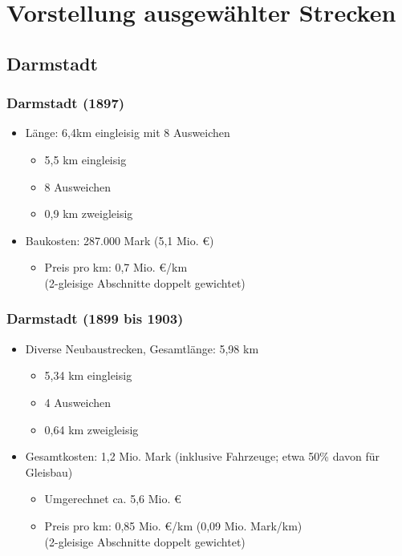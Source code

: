 \documentclass[xcolor=dvipsnames]{beamer}
\begin{document}
\section{Vorstellung ausgewählter Strecken}

\subsection{Darmstadt}
\begin{frame}
  \frametitle{Darmstadt (1897)}

  \begin{itemize}
    \item Länge: 6,4km eingleisig mit 8 Ausweichen
      \begin{itemize}
        \item 5,5 km eingleisig
        \item 8 Ausweichen
        \item 0,9 km zweigleisig
      \end{itemize}
    \item Baukosten: 287.000 Mark (5,1 Mio. €)
      \begin{itemize}
        \item Preis pro km: 0,7 Mio. €/km\\
          (2-gleisige Abschnitte doppelt gewichtet)
      \end{itemize}
  \end{itemize}
\end{frame}


\begin{frame}
  \frametitle{Darmstadt (1899 bis 1903)}

  \begin{itemize}
    \item Diverse Neubaustrecken, Gesamtlänge: 5,98 km
      \begin{itemize}
        \item 5,34 km eingleisig
        \item 4 Ausweichen
        \item 0,64 km zweigleisig
      \end{itemize}
    \item Gesamtkosten: 1,2 Mio. Mark (inklusive Fahrzeuge; etwa 50\%
      davon für Gleisbau)
      \begin{itemize}
        \item Umgerechnet ca. 5,6 Mio. €
        \item Preis pro km: 0,85 Mio. €/km (0,09 Mio. Mark/km)\\
          (2-gleisige Abschnitte doppelt gewichtet)
      \end{itemize}
  \end{itemize}
\end{frame}
\end{document}
